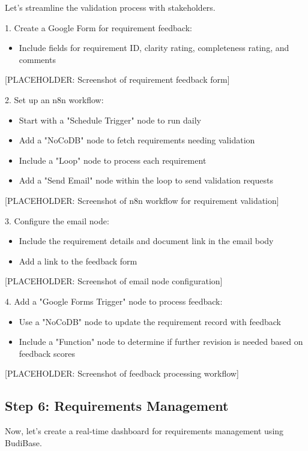 Let's streamline the validation process with stakeholders.

1. Create a Google Form for requirement feedback:
\begin{itemize}
    \item Include fields for requirement ID, clarity rating, completeness rating, and comments
\end{itemize}

[PLACEHOLDER: Screenshot of requirement feedback form]

2. Set up an n8n workflow:
\begin{itemize}
    \item Start with a "Schedule Trigger" node to run daily
    \item Add a "NoCoDB" node to fetch requirements needing validation
    \item Include a "Loop" node to process each requirement
    \item Add a "Send Email" node within the loop to send validation requests
\end{itemize}

[PLACEHOLDER: Screenshot of n8n workflow for requirement validation]

3. Configure the email node:
\begin{itemize}
    \item Include the requirement details and document link in the email body
    \item Add a link to the feedback form
\end{itemize}

[PLACEHOLDER: Screenshot of email node configuration]

4. Add a "Google Forms Trigger" node to process feedback:
\begin{itemize}
    \item Use a "NoCoDB" node to update the requirement record with feedback
    \item Include a "Function" node to determine if further revision is needed based on feedback scores
\end{itemize}

[PLACEHOLDER: Screenshot of feedback processing workflow]

\subsection{Step 6: Requirements Management}

Now, let's create a real-time dashboard for requirements management using BudiBase.


